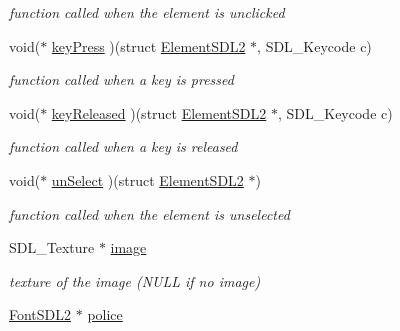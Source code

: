 \begin{DoxyCompactItemize}
\begin{DoxyCompactList}\small\item\em function called when the element is unclicked \end{DoxyCompactList}\item 
void($\ast$ \hyperlink{structElementSDL2_aff1dc935700d44a0ef0d53de7cca9d41}{key\+Press} )(struct \hyperlink{structElementSDL2}{Element\+S\+D\+L2} $\ast$, S\+D\+L\+\_\+\+Keycode c)\hypertarget{structElementSDL2_aff1dc935700d44a0ef0d53de7cca9d41}{}\label{structElementSDL2_aff1dc935700d44a0ef0d53de7cca9d41}

\begin{DoxyCompactList}\small\item\em function called when a key is pressed \end{DoxyCompactList}\item 
void($\ast$ \hyperlink{structElementSDL2_a76ecf85adcb072db772a8351ea7e04ee}{key\+Released} )(struct \hyperlink{structElementSDL2}{Element\+S\+D\+L2} $\ast$, S\+D\+L\+\_\+\+Keycode c)\hypertarget{structElementSDL2_a76ecf85adcb072db772a8351ea7e04ee}{}\label{structElementSDL2_a76ecf85adcb072db772a8351ea7e04ee}

\begin{DoxyCompactList}\small\item\em function called when a key is released \end{DoxyCompactList}\item 
void($\ast$ \hyperlink{structElementSDL2_a8057ee0d19cdd60ec568076206ee0e12}{un\+Select} )(struct \hyperlink{structElementSDL2}{Element\+S\+D\+L2} $\ast$)\hypertarget{structElementSDL2_a8057ee0d19cdd60ec568076206ee0e12}{}\label{structElementSDL2_a8057ee0d19cdd60ec568076206ee0e12}

\begin{DoxyCompactList}\small\item\em function called when the element is unselected \end{DoxyCompactList}\item 
S\+D\+L\+\_\+\+Texture $\ast$ \hyperlink{structElementSDL2_aab2ff0fd3a1c4370d7f1f9cdd250d056}{image}\hypertarget{structElementSDL2_aab2ff0fd3a1c4370d7f1f9cdd250d056}{}\label{structElementSDL2_aab2ff0fd3a1c4370d7f1f9cdd250d056}

\begin{DoxyCompactList}\small\item\em texture of the image (N\+U\+LL if no image) \end{DoxyCompactList}\item 
\hyperlink{structFontSDL2}{Font\+S\+D\+L2} $\ast$ \hyperlink{structElementSDL2_a785d4fada0ba0ac6b5ce7a53c379f8cd}{police}\hypertarget{structElementSDL2_a785d4fada0ba0ac6b5ce7a53c379f8cd}{}\label{structElementSDL2_a785d4fada0ba0ac6b5ce7a53c379f8cd}


\end{DoxyCompactItemize}
